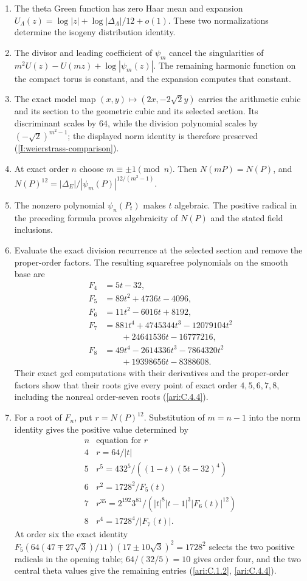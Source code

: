 \begin{enumerate}[label=\arabic*.]
\item The theta Green function has zero Haar mean and expansion
$U_\Lambda(z)=\log|z|+\log|\Delta_\Lambda|/12+o(1)$.
These two normalizations determine the isogeny distribution identity.
\item The divisor and leading coefficient of $\psi_m$ cancel the
singularities of $m^2U(z)-U(mz)+\log|\psi_m(z)|$.
The remaining harmonic function on the compact torus is constant,
and the expansion computes that constant.
\item The exact model map
$(x,y)\mapsto(2x,-2\sqrt2y)$ carries the arithmetic cubic and its
section to the geometric cubic and its selected section.
Its discriminant scales by $64$, while the division polynomial
scales by $(-\sqrt2)^{m^2-1}$; the displayed norm identity is
therefore preserved (\ref{I:weierstrass-comparison}).
\item At exact order $n$ choose $m\equiv\pm1\pmod n$.
Then $N(mP)=N(P)$, and
$N(P)^{12}=|\Delta_E|/|\psi_m(P)|^{12/(m^2-1)}$.
\item The nonzero polynomial $\psi_n(P_t)$ makes $t$ algebraic.
The positive radical in the preceding formula proves algebraicity
of $N(P)$ and the stated field inclusions.
\item Evaluate the exact division recurrence at the selected section
and remove the proper-order factors. The resulting squarefree
polynomials on the smooth base are
\[
\begin{aligned}
F_4&=5t-32,\\
F_5&=89t^2+4736t-4096,\\
F_6&=11t^2-6016t+8192,\\
F_7&=881t^4+4745344t^3-12079104t^2\\
   &\qquad+24641536t-16777216,\\
F_8&=49t^4-2614336t^3-7864320t^2\\
   &\qquad+19398656t-8388608.
\end{aligned}
\]
Their exact gcd computations with their derivatives and the
proper-order factors show that their roots give every point of
exact order $4,5,6,7,8$, including the nonreal order-seven roots
(\ref{ari:C.4.4}).
\item For a root of $F_n$, put $r=N(P)^{12}$. Substitution of
$m=n-1$ into the norm identity gives the positive value determined by
\[
\begin{array}{c|l}
n&\text{equation for }r\\ \hline
4&r=64/|t|\\
5&r^5=432^5/((1-t)(5t-32)^4)\\
6&r^2=1728^2/F_5(t)\\
7&r^{35}=2^{192}3^{81}/(|t|^8|t-1|^3|F_6(t)|^{12})\\
8&r^4=1728^4/|F_7(t)|.
\end{array}
\]
At order six the exact identity
$F_5(64(47\mp27\sqrt3)/11)(17\pm10\sqrt3)^2=1728^2$
selects the two positive radicals in the opening table;
$64/(32/5)=10$ gives order four, and the two central theta
values give the remaining entries
(\ref{ari:C.1.2}, \ref{ari:C.4.4}).
\end{enumerate}

